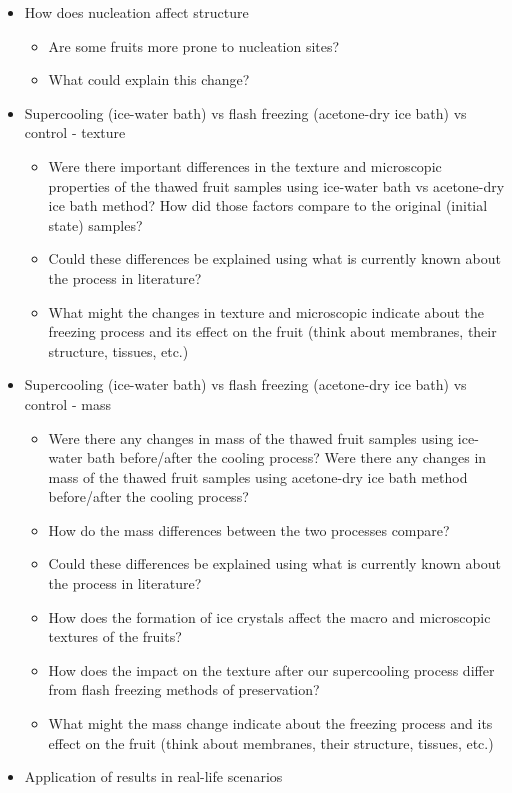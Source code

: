 \begin{itemize}
\item
  How does nucleation affect structure

  \begin{itemize}
  \item
    Are some fruits more prone to nucleation sites?
  \item
    What could explain this change?
  \end{itemize}
\item
  Supercooling (ice-water bath) vs flash freezing (acetone-dry ice bath)
  vs control - texture

  \begin{itemize}
  \item
    Were there important differences in the texture and microscopic
    properties of the thawed fruit samples using ice-water bath vs
    acetone-dry ice bath method? How did those factors compare to the
    original (initial state) samples?
  \item
    Could these differences be explained using what is currently known
    about the process in literature?
  \item
    What might the changes in texture and microscopic indicate about the
    freezing process and its effect on the fruit (think about membranes,
    their structure, tissues, etc.)
  \end{itemize}
\item
  Supercooling (ice-water bath) vs flash freezing (acetone-dry ice bath)
  vs control - mass

  \begin{itemize}
  \item
    Were there any changes in mass of the thawed fruit samples using
    ice-water bath before/after the cooling process? Were there any
    changes in mass of the thawed fruit samples using acetone-dry ice
    bath method before/after the cooling process?
  \item
    How do the mass differences between the two processes compare?
  \item
    Could these differences be explained using what is currently known
    about the process in literature?
  \item
    How does the formation of ice crystals affect the macro and
    microscopic textures of the fruits?
  \item
    How does the impact on the texture after our supercooling process
    differ from flash freezing methods of preservation?
  \item
    What might the mass change indicate about the freezing process and
    its effect on the fruit (think about membranes, their structure,
    tissues, etc.)
  \end{itemize}
\item
  Application of results in real-life scenarios


\end{itemize}
